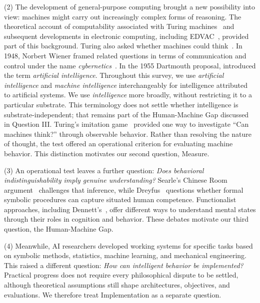 \documentclass[acmsmall,screen,review,anonymous]{acmart}
\begin{document}
(2) The development of general-purpose computing brought a new possibility into view: machines might carry out increasingly complex forms of reasoning.
%
The theoretical account of computability associated with Turing machines~\citep{turing1937machine} and subsequent developments in electronic computing, including EDVAC~\citep{neumann1993edvac}, provided part of this background.
%
Turing also asked whether machines could think~\citep{turing1950}.
%
In 1948, Norbert Wiener framed related questions in terms of communication and control under the name \textit{cybernetics}~\citep{wiener2019cybernetics}.
%
In the 1955 Dartmouth proposal, \citet{mccarthydartmouth} introduced the term \textit{artificial intelligence}.
%
Throughout this survey, we use \textit{artificial intelligence} and \textit{machine intelligence} interchangeably for intelligence attributed to artificial systems.
%
We use \textit{intelligence} more broadly, without restricting it to a particular substrate.
%
This terminology does not settle whether intelligence is substrate-independent; that remains part of the Human-Machine Gap discussed in Question III.
%
Turing's imitation game~\cite{turing1950} provided one way to investigate ``Can machines think?'' through observable behavior.
%
Rather than resolving the nature of thought, the test offered an operational criterion for evaluating machine behavior.
%
This distinction motivates our second question, Measure.

(3) An operational test leaves a further question: \textit{Does behavioral indistinguishability imply genuine understanding?}
%
Searle's Chinese Room argument~\citep{searle1980} challenges that inference, while Dreyfus~\citep{dreyfus1972} questions whether formal symbolic procedures can capture situated human competence.
%
Functionalist approaches, including Dennett's~\citep{dennett1987}, offer different ways to understand mental states through their roles in cognition and behavior.
%
These debates motivate our third question, the Human-Machine Gap.

(4) Meanwhile, AI researchers developed working systems for specific tasks based on symbolic methods, statistics, machine learning, and mechanical engineering.
%
This raised a different question: \textit{How can intelligent behavior be implemented?}
%
Practical progress does not require every philosophical dispute to be settled, although theoretical assumptions still shape architectures, objectives, and evaluations.
%
We therefore treat Implementation as a separate question.
\end{document}
